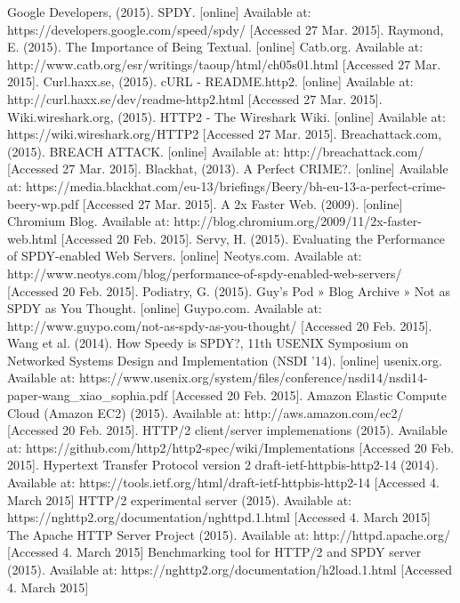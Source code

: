 \begin{thebibliography}{99}
Google Developers, (2015). SPDY. [online] Available at: https://developers.google.com/speed/spdy/ [Accessed 27 Mar. 2015].
Raymond, E. (2015). The Importance of Being Textual. [online] Catb.org. Available at: http://www.catb.org/esr/writings/taoup/html/ch05s01.html [Accessed 27 Mar. 2015].
Curl.haxx.se, (2015). cURL - README.http2. [online] Available at: http://curl.haxx.se/dev/readme-http2.html [Accessed 27 Mar. 2015].
Wiki.wireshark.org, (2015). HTTP2 - The Wireshark Wiki. [online] Available at: https://wiki.wireshark.org/HTTP2 [Accessed 27 Mar. 2015].
Breachattack.com, (2015). BREACH ATTACK. [online] Available at: http://breachattack.com/ [Accessed 27 Mar. 2015].
Blackhat, (2013). A Perfect CRIME?. [online] Available at: https://media.blackhat.com/eu-13/briefings/Beery/bh-eu-13-a-perfect-crime-beery-wp.pdf [Accessed 27 Mar. 2015].
A 2x Faster Web. (2009). [online] Chromium Blog. Available at: http://blog.chromium.org/2009/11/2x-faster-web.html [Accessed 20 Feb. 2015].
Servy, H. (2015). Evaluating the Performance of SPDY-enabled Web Servers. [online] Neotys.com. Available at: http://www.neotys.com/blog/performance-of-spdy-enabled-web-servers/ [Accessed 20 Feb. 2015].
Podiatry, G. (2015). Guy's Pod » Blog Archive » Not as SPDY as You Thought. [online] Guypo.com. Available at: http://www.guypo.com/not-as-spdy-as-you-thought/ [Accessed 20 Feb. 2015].
Wang et al. (2014). How Speedy is SPDY?, 11th USENIX Symposium on Networked Systems Design and Implementation (NSDI ’14). [online] usenix.org. Available at:
https://www.usenix.org/system/files/conference/nsdi14/nsdi14-paper-wang\_xiao\_sophia.pdf [Accessed 20 Feb. 2015].
 Amazon Elastic Compute Cloud (Amazon EC2) (2015). Available at: http://aws.amazon.com/ec2/ [Accessed 20 Feb. 2015].
  HTTP/2 client/server implemenations (2015). Available at: https://github.com/http2/http2-spec/wiki/Implementations [Accessed 20 Feb. 2015].
 Hypertext Transfer Protocol version 2 draft-ietf-httpbis-http2-14 (2014). Available at: https://tools.ietf.org/html/draft-ietf-httpbis-http2-14 [Accessed 4. March 2015]
 HTTP/2 experimental server (2015). Available at: https://nghttp2.org/documentation/nghttpd.1.html [Accessed 4. March 2015]
 The Apache HTTP Server Project (2015). Available at: http://httpd.apache.org/ [Accessed 4. March 2015]
 Benchmarking tool for HTTP/2 and SPDY server (2015). Available at: https://nghttp2.org/documentation/h2load.1.html [Accessed 4. March 2015]

\end{thebibliography}
